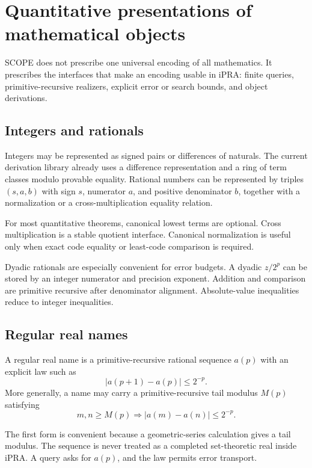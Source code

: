 \section{Quantitative presentations of mathematical objects}
\label{sec:quantitative-presentations}

SCOPE does not prescribe one universal encoding of all mathematics.  It prescribes the interfaces that make an encoding usable in iPRA: finite queries, primitive-recursive realizers, explicit error or search bounds, and object derivations.

\subsection{Integers and rationals}

Integers may be represented as signed pairs or differences of naturals.  The current derivation library already uses a difference representation and a ring of term classes modulo provable equality.  Rational numbers can be represented by triples \((s,a,b)\) with sign \(s\), numerator \(a\), and positive denominator \(b\), together with a normalization or a cross-multiplication equality relation.

For most quantitative theorems, canonical lowest terms are optional.  Cross multiplication is a stable quotient interface.  Canonical normalization is useful only when exact code equality or least-code comparison is required.

Dyadic rationals are especially convenient for error budgets.  A dyadic \(z/2^p\) can be stored by an integer numerator and precision exponent.  Addition and comparison are primitive recursive after denominator alignment.  Absolute-value inequalities reduce to integer inequalities.

\subsection{Regular real names}

\begin{definition}
A regular real name is a primitive-recursive rational sequence \(a(p)\) with an explicit law such as
\[
  |a(p+1)-a(p)|\le 2^{-p}.
\]
More generally, a name may carry a primitive-recursive tail modulus \(M(p)\) satisfying
\[
  m,n\ge M(p)\Longrightarrow |a(m)-a(n)|\le 2^{-p}.
\]
\end{definition}

The first form is convenient because a geometric-series calculation gives a tail modulus.  The sequence is never treated as a completed set-theoretic real inside iPRA.  A query asks for \(a(p)\), and the law permits error transport.

